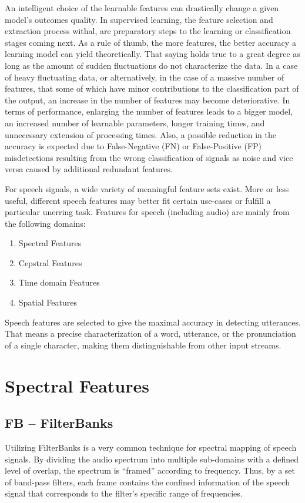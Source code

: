 An intelligent choice of the learnable features 
\cite{7845025} 
can drastically change a given model's outcomes quality.
In supervised learning, the 
feature selection and extraction process withal,
are preparatory steps to the learning or classification
stages coming next.
As a rule of thumb, the more features, the better accuracy
a learning model can yield theoretically\cite{lessIsMore}.
That saying holds true to a great degree
as long as the amount of sudden fluctuations do not characterize the data.
In a case of heavy fluctuating data,
or alternatively, in the case of a 
massive number of features, 
that some of which have minor contributions 
to the classification part of the output,
an increase in the number of features may become deteriorative.
In terms of performance, 
enlarging the number of features leads to a bigger model, 
an increased number of learnable parameters, 
longer training times, 
and unnecessary extension of processing times.
Also, a possible reduction in the accuracy is 
expected due to 
False-Negative (FN) or False-Positive (FP) 
misdetections resulting from the wrong 
classification of signals as noise and 
vice versa caused by additional redundant features.

For speech signals, a wide variety of 
meaningful feature sets exist. 
More or less useful, different speech features 
may better fit certain use-cases or fulfill 
a particular unerring task. 
Features for speech (including audio) 
are mainly from the following domains:
\begin{enumerate}
    \item Spectral Features
    \item Cepstral Features
    \item Time domain Features
    \item Spatial Features
\end{enumerate}

Speech features are selected 
to give the maximal accuracy in detecting utterances.
That means a precise characterization of a 
word, utterance, or the pronunciation of 
a single character, making them distinguishable
from other input streams. 

\section{Spectral Features}
\subsection{FB -- FilterBanks}
Utilizing FilterBanks is a very common technique
for spectral mapping of speech signals.
By dividing the audio spectrum into multiple 
sub-domains with a defined level of overlap, 
the spectrum is 
``framed'' according to frequency. 
Thus, by a set of band-pass filters,
each frame contains the confined 
information of the speech signal 
that corresponds to the filter's specific 
range of frequencies.

